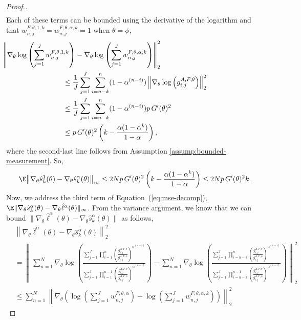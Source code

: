 \begin{proof}[Proof.]
\begin{align}
\end{align}
Each of these terms can be bounded using the derivative of the logarithm and that $w_{n,j}^{F,\theta,1,k} = w_{n,j}^{F,\theta,\alpha,k} = 1$ when $\theta=\phi$,
\begin{align}
    & \hspace{-30mm}
    \left\lVert\nabla_\theta\log\left(\sum_{j=1}^J w_{n,j}^{F,\theta,1,k}\right)-\nabla_\theta\log\left(\sum_{j=1}^J w_{n,j}^{F,\theta,\alpha,k}\right)\right\rVert_{2}^2
    \\
    &\leq \frac{1}{J}\sum_{j=1}^J \sum_{i=n-k}^{n}(1-\alpha^{(n-i)})\left\lVert\nabla_\theta\log\left(g_{i,j}^{A,F,\theta} \right)\right\rVert_2^2
    \\
    &\leq \frac{1}{J}\sum_{j=1}^J \sum_{i=n-k}^{n}(1-\alpha^{(n-i)})p \, G'(\theta)^2
    \\
    &\leq p \, G'(\theta)^2\left(k-\frac{\alpha(1-\alpha^k)}{1-\alpha}\right),
\end{align}
where the second-last line follows from Assumption \ref{assump:bounded-measurement}.
So, 
\begin{align}
    \E\big\|\nabla_\theta\hat s_k^1(\theta) - \nabla_\theta\hat s_k^\alpha(\theta)\big\|_\infty
    \leq 2Np \, G'(\theta)^2\left(k-\frac{\alpha(1-\alpha^k)}{1-\alpha}\right) 
    \leq 2Np \, G'(\theta)^2k.
\end{align}
Now, we address the third term of Equation~(\ref{eq:mse-decomp}), $\E\|\nabla_\theta\hat s_k^\alpha(\theta) -  \nabla_\theta\hat\ell^\alpha(\theta)\|_\infty$. From the variance argument, we know that we can bound $\|\nabla_\theta\hat\ell^\alpha(\theta) - \nabla_\theta \hat s_k^\alpha(\theta)\|$ as follows,
\begin{align}
    &\left\lVert \nabla_\theta\hat\ell^\alpha(\theta) - \nabla_\theta \hat s_k^\alpha(\theta) \right\rVert_2^2
    \nonumber \\
    &= \left\lVert\sum_{n=1}^N \! \nabla_\theta \log \! \left( \! \frac{\sum_{j=1}^J\prod_{i=1}^n\left(\frac{g_{i,j}^{A,F,\theta}}{g_{i,j}^{A,F,\phi}} \right)^{\alpha^{(n-i)}}}{\sum_{j=1}^J\prod_{i=1}^{n-1}\left(\frac{g_{i,j}^{A,F,\theta}}{g_{i,j}^{A,F,\phi}} \right)^{\alpha^{(n-i)}}}\right) 
    \!-\! 
\sum_{n=1}^N\!\nabla_\theta\log\!\left(\!\frac{\sum_{j=1}^J\prod_{i=n-k}^n\left(\frac{g_{i,j}^{A,F,\theta}}{g_{i,j}^{A,F,\phi}} \right)^{\alpha^{(n-i)}}}{\sum_{j=1}^J\prod_{i=n-k}^{n-1}\left(\frac{g_{i,j}^{A,F,\theta}}{g_{i,j}^{A,F,\phi}} \right)^{\alpha^{(n-i)}}}\right) \! \right\rVert_2^2
    \nonumber \\ 
    &\leq \sum_{n=1}^N \left\lVert\nabla_\theta \left(\log\left(\sum_{j=1}^Jw_{n,j}^{F,\theta,\alpha}\right)- \log\!\left(\sum_{j=1}^Jw_{n,j}^{F,\theta,\alpha,k}\right)\right)\right\lVert_2^2

\end{align}
\end{proof}
